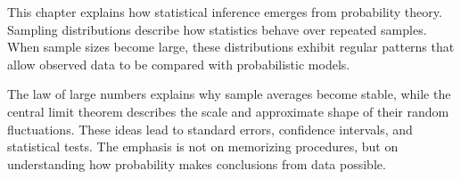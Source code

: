 This chapter explains how statistical inference emerges from probability theory. Sampling distributions describe how statistics behave over repeated samples. When sample sizes become large, these distributions exhibit regular patterns that allow observed data to be compared with probabilistic models.

The law of large numbers explains why sample averages become stable, while the central limit theorem describes the scale and approximate shape of their random fluctuations. These ideas lead to standard errors, confidence intervals, and statistical tests. The emphasis is not on memorizing procedures, but on understanding how probability makes conclusions from data possible.









